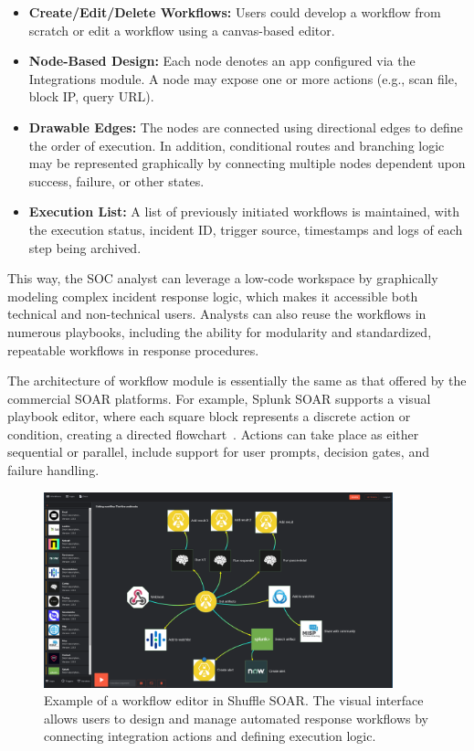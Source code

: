 \begin{itemize}[noitemsep,topsep=0pt]
    \item \textbf{Create/Edit/Delete Workflows:} Users could develop a workflow from scratch or edit a workflow using a canvas-based editor.
    
    \item \textbf{Node-Based Design:} Each node denotes an app configured via the Integrations module. A node may expose one or more actions (e.g., scan file, block IP, query URL).
    
    \item \textbf{Drawable Edges:} The nodes are connected using directional edges to define the order of execution. In addition, conditional routes and branching logic may be represented graphically by connecting multiple nodes dependent upon success, failure, or other states.
    
    \item \textbf{Execution List:} A list of previously initiated workflows is maintained, with the execution status, incident ID, trigger source, timestamps and logs of each step being archived.
\end{itemize}

This way, the SOC analyst can leverage a low-code workspace by graphically modeling complex incident response logic, which makes it accessible both technical and non-technical users. Analysts can also reuse the workflows in numerous playbooks, including the ability for modularity and standardized, repeatable workflows in response procedures.

The architecture of workflow module is essentially the same as that offered by the commercial SOAR platforms. For example, Splunk SOAR supports a visual playbook editor, where each square block represents a discrete action or condition, creating a directed flowchart~\cite{splunk}. Actions can take place as either sequential or parallel, include support for user prompts, decision gates, and failure handling.
\begin{figure}[ht]
    \centering
    \includegraphics[width=0.9\textwidth]{images/shuffle_soar_workflow.png}
        \caption[Example of a workflow editor in Shuffle SOAR]{Example of a workflow editor in Shuffle SOAR. The visual interface allows users to design and manage automated response workflows by connecting integration actions and defining execution logic.}
    \label{fig:shuffle-soar-workflow}
\end{figure}


